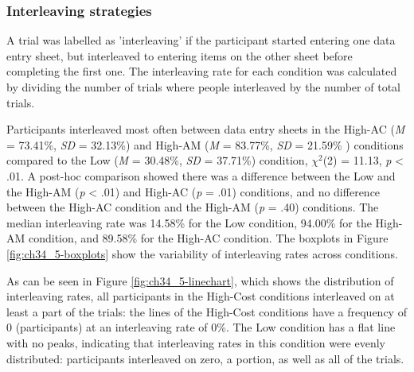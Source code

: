 \subsubsection{Interleaving strategies}
A trial was labelled as 'interleaving' if the participant started entering one data entry sheet, but interleaved to entering items on the other sheet before completing the first one. The interleaving rate for each condition was calculated by dividing the number of trials where people interleaved by the number of total trials. 

Participants interleaved most often between data entry sheets in the High-AC (\textit{M} = 73.41\%, \textit{SD} = 32.13\%) and High-AM (\textit{M} = 83.77\%, \textit{SD} = 21.59\% ) conditions compared to the Low (\textit{M} = 30.48\%, \textit{SD} = 37.71\%) condition, $\chi^2$(2) = 11.13, \textit{p} < .01. A post-hoc comparison showed there was a difference between the Low and the High-AM (\textit{p} < .01) and High-AC (\textit{p} = .01) conditions, and no difference between the High-AC condition and the High-AM (\textit{p} = .40) conditions. The median interleaving rate was 14.58\% for the Low condition, 94.00\% for the High-AM condition, and 89.58\% for the High-AC condition. The boxplots in Figure \ref{fig:ch34_5-boxplots} show the variability of interleaving rates across conditions. 

As can be seen in Figure \ref{fig:ch34_5-linechart}, which shows the distribution of interleaving rates, all participants in the High-Cost conditions interleaved on at least a part of the trials: the lines of the High-Cost conditions have a frequency of 0 (participants) at an interleaving rate of 0\%. The Low condition has a flat line with no peaks, indicating that interleaving rates in this condition were evenly distributed: participants interleaved on zero, a portion, as well as all of the trials.

